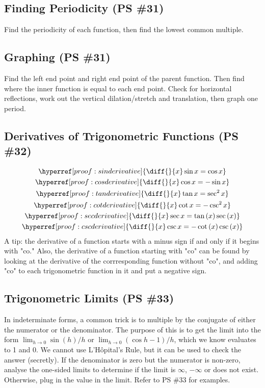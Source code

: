 \documentclass{article}
\begin{document}
\subsection{Finding Periodicity (PS \#31)}
Find the periodicity of each function, then find the lowest
common multiple.

\subsection{Graphing (PS \#31)}
Find the left end point and right end point of the parent function.
Then find where the inner function is equal to each end point.
Check for horizontal reflections, work out the vertical
dilation/stretch and translation, then graph one period.

\subsection{Derivatives of Trigonometric Functions (PS \#32)}
\begin{gather*}
	\hyperref[proof:sinderivative]{
		\diff{}{x}\sin x=\cos x
	} \\
	\hyperref[proof:cosderivative]{
		\diff{}{x}\cos x=-\sin x
	} \\
	\hyperref[proof:tanderivative]{
		\diff{}{x}\tan x=\sec^2x
	} \\
	\hyperref[proof:cotderivative]{
		\diff{}{x}\cot x=-\csc^2x
	} \\
	\hyperref[proof:secderivative]{
		\diff{}{x}\sec x=\tan\left(x\right)\sec\left(x\right)
	} \\
	\hyperref[proof:cscderivative]{
		\diff{}{x}\csc x=-\cot\left(x\right)\csc\left(x\right)
	}
\end{gather*}
A tip: the derivative of a function starts with a minus sign if
and only if it begins with "co." Also, the derivative of a
function starting with "co" can be found by looking at the
derivative of the corrresponding function without "co", and adding
"co" to each trigonometric function in it and put a negative sign.

\subsection{Trigonometric Limits (PS \#33)}
In indeterminate forms, a common trick is to multiple by the
conjugate of either the numerator or the denominator. The purpose
of this is to get the limit into the form $\lim_{h\to0}\sin\left(
h\right)/h$ or $\lim_{h\to0}\left(\cos h-1\right)/h$, which we know
evaluates to 1 and 0. We cannot use L'Hôpital's Rule, but it can be
used to check the answer (secretly). If the denominator is zero but
the numerator is non-zero, analyse the one-sided limits to determine
if the limit is $\infty$, $-\infty$ or does not exist. Otherwise,
plug in the value in the limit. Refer to PS \#33 for examples.
\end{document}
